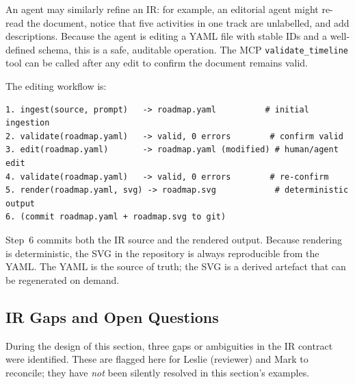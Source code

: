 An agent may similarly refine an IR: for example, an editorial agent might re-read the
document, notice that five activities in one track are unlabelled, and add descriptions.
Because the agent is editing a YAML file with stable IDs and a well-defined schema, this
is a safe, auditable operation. The MCP \texttt{validate\_timeline} tool can be called
after any edit to confirm the document remains valid.

The editing workflow is:

\begin{lstlisting}[caption={Iterative refinement loop (human or agent)}]
1. ingest(source, prompt)   -> roadmap.yaml          # initial ingestion
2. validate(roadmap.yaml)   -> valid, 0 errors        # confirm valid
3. edit(roadmap.yaml)       -> roadmap.yaml (modified) # human/agent edit
4. validate(roadmap.yaml)   -> valid, 0 errors        # re-confirm
5. render(roadmap.yaml, svg) -> roadmap.svg            # deterministic output
6. (commit roadmap.yaml + roadmap.svg to git)
\end{lstlisting}

Step~6 commits both the IR source and the rendered output. Because rendering is
deterministic, the SVG in the repository is always reproducible from the YAML. The YAML
is the source of truth; the SVG is a derived artefact that can be regenerated on demand.


\subsection{IR Gaps and Open Questions}
\label{sec:ir-gaps}

During the design of this section, three gaps or ambiguities in the IR contract were
identified. These are flagged here for Leslie (reviewer) and Mark to reconcile; they
have \emph{not} been silently resolved in this section's examples.

